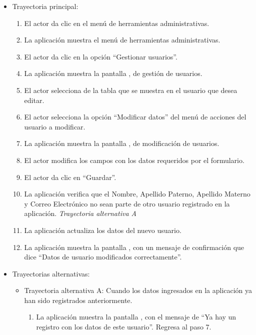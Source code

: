			\begin{itemize}
				\item Trayectoria principal:
					\begin{enumerate}
						\item El actor da clic en el menú de herramientas administrativas.
						\item La aplicación muestra el menú de herramientas administrativas.
						\item El actor da clic en la opción ``Gestionar usuarios''.
						\item La aplicación muestra la pantalla , de gestión de usuarios.
						\item El actor selecciona de la tabla que se muestra en  el usuario que desea editar.
						\item El actor selecciona la opción ``Modificar datos'' del menú de acciones del usuario a modificar.
						\item La aplicación muestra la pantalla , de modificación de usuarios.
						\item El actor modifica los campos con los datos requeridos por el formulario.
						\item El actor da clic en ``Guardar''.
						\item La aplicación verifica que el Nombre, Apellido Paterno, Apellido Materno y Correo Electrónico no sean parte de otro usuario registrado en la aplicación. \textsl{Trayectoria alternativa A}
						\item La aplicación actualiza los datos del nuevo usuario.
						\item La aplicación muestra la pantalla , con un mensaje de confirmación que dice ``Datos de usuario modificados correctamente''.
					\end{enumerate}
				\item Trayectorias alternativas:
					\begin{itemize}
						\item Trayectoria alternativa A: Cuando los datos ingresados en la aplicación ya han sido registrados anteriormente.
							\begin{enumerate}
								\item La aplicación muestra la pantalla , con el mensaje de ``Ya hay un registro con los datos de este usuario''. Regresa al paso 7.
							\end{enumerate}
					\end{itemize}
			\end{itemize}
		
